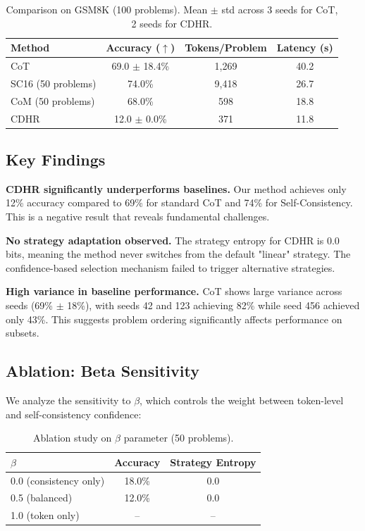 \documentclass{article}
\begin{document}
\begin{table}[h]
\centering
\caption{Comparison on GSM8K (100 problems). Mean $\pm$ std across 3 seeds for CoT, 2 seeds for CDHR.}
\label{tab:main}
\begin{tabular}{lccc}
\toprule
Method & Accuracy ($\uparrow$) & Tokens/Problem & Latency (s) \\
\midrule
CoT & 69.0 $\pm$ 18.4\% & 1,269 & 40.2 \\
SC16 (50 problems) & 74.0\% & 9,418 & 26.7 \\
CoM (50 problems) & 68.0\% & 598 & 18.8 \\
CDHR & 12.0 $\pm$ 0.0\% & 371 & 11.8 \\
\bottomrule
\end{tabular}
\end{table}

\subsection{Key Findings}

\textbf{CDHR significantly underperforms baselines.} Our method achieves only 12\% accuracy compared to 69\% for standard CoT and 74\% for Self-Consistency. This is a negative result that reveals fundamental challenges.

\textbf{No strategy adaptation observed.} The strategy entropy for CDHR is 0.0 bits, meaning the method never switches from the default "linear" strategy. The confidence-based selection mechanism failed to trigger alternative strategies.

\textbf{High variance in baseline performance.} CoT shows large variance across seeds (69\% $\pm$ 18\%), with seeds 42 and 123 achieving 82\% while seed 456 achieved only 43\%. This suggests problem ordering significantly affects performance on subsets.

\subsection{Ablation: Beta Sensitivity}

We analyze the sensitivity to $\beta$, which controls the weight between token-level and self-consistency confidence:

\begin{table}[h]
\centering
\caption{Ablation study on $\beta$ parameter (50 problems).}
\label{tab:beta}
\begin{tabular}{lcc}
\toprule
$\beta$ & Accuracy & Strategy Entropy \\
\midrule
0.0 (consistency only) & 18.0\% & 0.0 \\
0.5 (balanced) & 12.0\% & 0.0 \\
1.0 (token only) & -- & -- \\
\bottomrule
\end{tabular}
\end{table}
\end{document}
